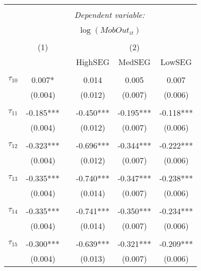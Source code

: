 \begin{tabular}{@{\extracolsep{-5pt}}lccccc} 
\\[-1.8ex]\hline 
\hline \\[-1.8ex] 
 & \multicolumn{5}{c}{\textit{Dependent variable:}} \\ 
\cline{2-6} 
\\[-1.8ex] & \multicolumn{5}{c}{$\log(MobOut_{it})$}\\ 
\\[-1.8ex] & (1) && \multicolumn{3}{c}{(2)} \\ 
\cline{2-2}\cline{4-6}
        &&& HighSEG & MedSEG & LowSEG  \\
 \\[-1.8ex] 
$\tau_{10}$     &  0.007*   &&   0.014   &   0.005   &   0.007   \\
                &  (0.004)  &&  (0.012)  &  (0.007)  &  (0.006)  \\
                &           &&           &           &           \\[-2.1ex]
$\tau_{11}$     & -0.185*** && -0.450*** & -0.195*** & -0.118*** \\
                &  (0.004)  &&  (0.012)  &  (0.007)  &  (0.006)  \\
                &           &&           &           &           \\[-2.1ex]
$\tau_{12}$     & -0.323*** && -0.696*** & -0.344*** & -0.222*** \\
                &  (0.004)  &&  (0.012)  &  (0.007)  &  (0.006)  \\
                &           &&           &           &           \\[-2.1ex]
$\tau_{13}$     & -0.335*** && -0.740*** & -0.347*** & -0.238*** \\
                &  (0.004)  &&  (0.014)  &  (0.007)  &  (0.006)  \\
                &           &&           &           &           \\[-2.1ex]
$\tau_{14}$     & -0.335*** && -0.741*** & -0.350*** & -0.234*** \\
                &  (0.004)  &&  (0.014)  &  (0.007)  &  (0.006)  \\
                &           &&           &           &           \\[-2.1ex]
$\tau_{15}$     & -0.300*** && -0.639*** & -0.321*** & -0.209*** \\
                &  (0.004)  &&  (0.013)  &  (0.007)  &  (0.006)  \\

\end{tabular}
